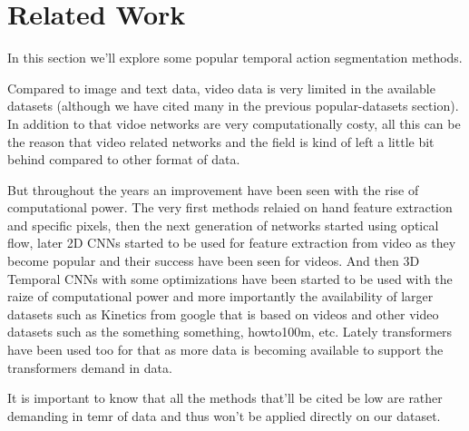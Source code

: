 \section{Related Work}


In this section we'll explore some popular temporal action segmentation methods.

Compared to image and text data, video data is very limited in the available datasets (although we have cited many in the previous popular-datasets section). In addition to that vidoe networks are very computationally costy, all this can be the reason that video related networks and the field is kind of left a little bit behind compared to other format of data.

But throughout the years an improvement have been seen with the rise of computational power. The very first methods relaied on hand feature extraction and specific pixels, then the next generation of networks started using optical flow, later 2D CNNs started to be used for feature extraction from video as they become popular and their success have been seen for videos. And then 3D Temporal CNNs with some optimizations have been started to be used with the raize of computational power and more importantly the 
availability of larger datasets such as Kinetics from google that is based on videos and other video datasets such as the something something, howto100m, etc. Lately transformers have been used too for that as more data is becoming available to support the transformers demand in data.

It is important to know that all the methods that'll be cited be low are rather demanding in temr of data and thus won't be applied directly on our dataset.




